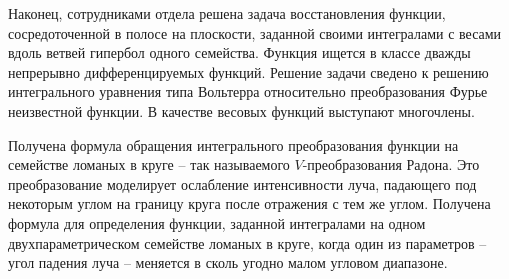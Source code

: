 


Наконец, сотрудниками отдела решена задача восстановления функции, сосредоточенной в полосе на плоскости, заданной своими интегралами с весами вдоль ветвей гипербол одного семейства. Функция ищется в классе дважды непрерывно дифференцируемых функций. Решение задачи сведено к решению интегрального уравнения типа Вольтерра относительно преобразования Фурье неизвестной функции. В качестве весовых функций выступают многочлены.


Получена формула обращения интегрального преобразования функции на семействе ломаных в круге – так называемого $V$-преобразования Радона. Это преобразование моделирует ослабление интенсивности луча, падающего под некоторым углом на границу круга после отражения с тем же углом.
Получена формула для определения функции, заданной интегралами на одном двухпараметрическом семействе ломаных в круге, когда один из параметров – угол падения луча – меняется в сколь угодно малом угловом диапазоне.






